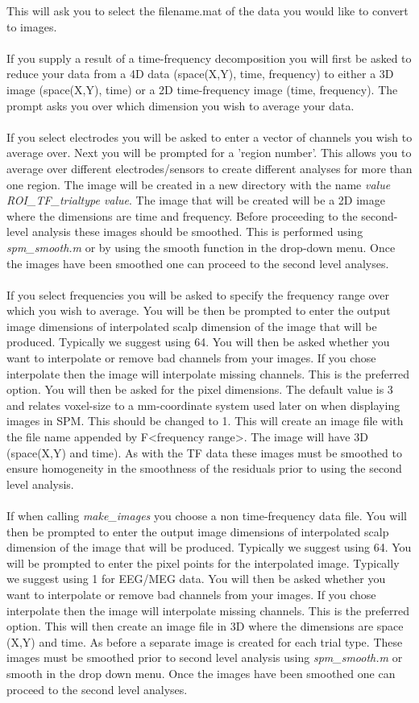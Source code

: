 This will ask you to select the filename.mat of the data you would like to convert to images. 
\\
\\
If you supply a result of a time-frequency decomposition you will first be asked to reduce your data from a 4D data (space(X,Y), time, frequency) to either a 3D image (space(X,Y), time) or a 2D time-frequency image (time, frequency). The prompt asks you over which dimension you wish to average your data. 
\\
\\
If you select electrodes you will be asked to enter a vector of channels you wish to average over. Next you will be prompted for a 'region number'. This allows you to average over different electrodes/sensors to create different analyses for more than one region. The image will be created in a new directory with the name \textit{value ROI\_TF\_trialtype value}. The image that will be created will be a 2D image where the dimensions are time and frequency. Before proceeding to the second-level analysis these images should be smoothed. This is performed using \textit{spm\_smooth.m} or by using the smooth function in the drop-down menu. Once the images have been smoothed one can proceed to the second level analyses.
\\
\\
If you select frequencies you will be asked to specify the frequency range over which you wish to average. You will be then be prompted to enter the output image dimensions of interpolated scalp dimension of the image that will be produced. Typically we suggest using 64.  You will then be asked whether you want to interpolate or remove bad channels from your images. If you chose interpolate then the image will interpolate missing channels. This is the preferred option. You will then be asked for the pixel dimensions. The default value is 3 and relates voxel-size to a mm-coordinate system used later on when displaying images in SPM. This should be changed to 1. This will create an image file with the file name appended by F<frequency range>. The image will have 3D (space(X,Y) and time). As with the TF data these images must be smoothed to ensure homogeneity in the smoothness of the residuals prior to using the second level analysis.
\\
\\
If when calling \textit{make\_images} you choose a non time-frequency data file. You will then be prompted to enter the output image dimensions of interpolated scalp dimension of the image that will be produced. Typically we suggest using 64.  You will be prompted to enter the pixel points for the interpolated image. Typically we suggest using 1 for EEG/MEG data. You will then be asked whether you want to interpolate or remove bad channels from your images. If you chose interpolate then the image will interpolate missing channels. This is the preferred option.  This will then create an image file in 3D where the dimensions are space (X,Y) and time. As before a separate image is created for each trial type. These images must be smoothed prior to second level analysis using \textit{spm\_smooth.m} or smooth in the drop down menu. Once the images have been smoothed one can proceed to the second level analyses.





